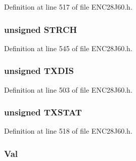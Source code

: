 Definition at line 517 of file E\+N\+C28\+J60.\+h.

\hypertarget{union_p_h_y_r_e_g_af010f4597cbdc0e2da9f9b03319e4f09}{}
\subsubsection[{S\+T\+R\+C\+H}]{\setlength{\rightskip}{0pt plus 5cm}unsigned S\+T\+R\+C\+H}\label{union_p_h_y_r_e_g_af010f4597cbdc0e2da9f9b03319e4f09}


Definition at line 545 of file E\+N\+C28\+J60.\+h.

\hypertarget{union_p_h_y_r_e_g_a4d3498a0ecfe1be782c3891a7498cc50}{}
\subsubsection[{T\+X\+D\+I\+S}]{\setlength{\rightskip}{0pt plus 5cm}unsigned T\+X\+D\+I\+S}\label{union_p_h_y_r_e_g_a4d3498a0ecfe1be782c3891a7498cc50}


Definition at line 503 of file E\+N\+C28\+J60.\+h.

\hypertarget{union_p_h_y_r_e_g_a14502fe08508ae8714227563d36592f1}{}
\subsubsection[{T\+X\+S\+T\+A\+T}]{\setlength{\rightskip}{0pt plus 5cm}unsigned T\+X\+S\+T\+A\+T}\label{union_p_h_y_r_e_g_a14502fe08508ae8714227563d36592f1}


Definition at line 518 of file E\+N\+C28\+J60.\+h.

\hypertarget{union_p_h_y_r_e_g_aa498550e7f87da9a38dc71609652e6bd}{}
\subsubsection[{Val}]{ Val}\label{union_p_h_y_r_e_g_aa498550e7f87da9a38dc71609652e6bd}


